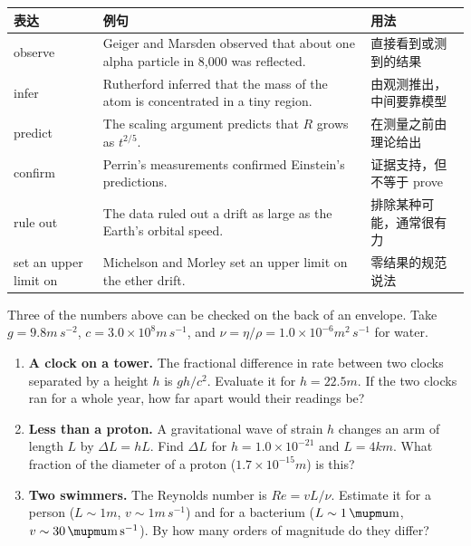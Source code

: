 \documentclass[11pt,a4paper]{article}
\begin{document}
\begin{center}
\small
\begin{tabular}{>{\raggedright\arraybackslash}p{2.3cm}p{8.0cm}p{4.7cm}}
\toprule
\headrow 表达 & 例句 & 用法 \\
\midrule
observe & Geiger and Marsden observed that about one alpha particle in 8,000 was reflected. & 直接看到或测到的结果 \\
infer & Rutherford inferred that the mass of the atom is concentrated in a tiny region. & 由观测推出，中间要靠模型 \\
predict & The scaling argument predicts that $R$ grows as $t^{2/5}$. & 在测量之前由理论给出 \\
confirm & Perrin's measurements confirmed Einstein's predictions. & 证据支持，但不等于 prove \\
rule out & The data ruled out a drift as large as the Earth's orbital speed. & 排除某种可能，通常很有力 \\
set an upper limit on & Michelson and Morley set an upper limit on the ether drift. & 零结果的规范说法 \\
\bottomrule
\end{tabular}
\end{center}

Three of the numbers above can be checked on the back of an envelope. Take $g=9.8\unit{m\,s^{-2}}$, $c=3.0\times10^{8}\unit{m\,s^{-1}}$, and $\nu=\eta/\rho=1.0\times10^{-6}\unit{m^2\,s^{-1}}$ for water.

\begin{enumerate}[label=\textbf{\arabic*.}]
  \item \textbf{A clock on a tower.} The fractional difference in rate between two clocks separated by a height $h$ is $gh/c^2$. Evaluate it for $h=22.5\unit{m}$. If the two clocks ran for a whole year, how far apart would their readings be?
  \item \textbf{Less than a proton.} A gravitational wave of strain $h$ changes an arm of length $L$ by $\Delta L=hL$. Find $\Delta L$ for $h=1.0\times10^{-21}$ and $L=4\unit{km}$. What fraction of the diameter of a proton ($1.7\times10^{-15}\unit{m}$) is this?
  \item \textbf{Two swimmers.} The Reynolds number is $\mathit{Re}=vL/\nu$. Estimate it for a person ($L\sim1\unit{m}$, $v\sim1\unit{m\,s^{-1}}$) and for a bacterium ($L\sim1\,\mupmu\mathrm{m}$, $v\sim30\,\mupmu\mathrm{m\,s^{-1}}$). By how many orders of magnitude do they differ?
\end{enumerate}

\end{document}

